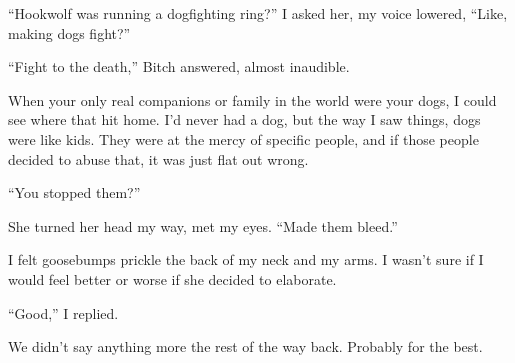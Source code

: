 ``Hookwolf was running a dogfighting ring?'' I asked her, my voice lowered, ``Like, making dogs fight?''



``Fight to the death,'' Bitch answered, almost inaudible.



When your only real companions or family in the world were your dogs, I could see where that hit home.  I'd never had a dog, but the way I saw things, dogs were like kids.  They were at the mercy of specific people, and if those people decided to abuse that, it was just flat out wrong.



``You stopped them?''



She turned her head my way, met my eyes.  ``Made them bleed.''



I felt goosebumps prickle the back of my neck and my arms.  I wasn't sure if I would feel better or worse if she decided to elaborate.



``Good,'' I replied.



We didn't say anything more the rest of the way back.  Probably for the best.





